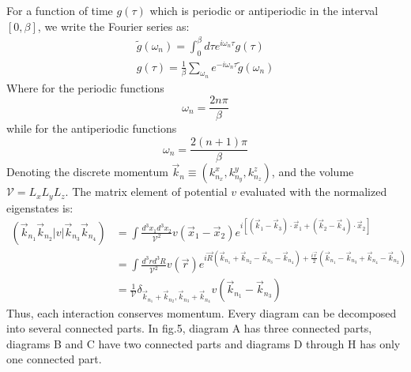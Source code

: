 \documentclass[12pt]{article}
\begin{document}
For a function of time $g(\tau)$ which is periodic or antiperiodic in the interval 
$[0,\beta]$, we write the Fourier series as:
\begin{equation*}
    \begin{split}
        \tilde{g}(\omega_n)=\int_0^\beta d\tau e^{i\omega_n\tau}g(\tau)\\
        g(\tau)=\frac{1}{\beta}\sum_{\omega_n}e^{-i\omega_n\tau}\tilde{g}(\omega_n)
    \end{split}
\end{equation*}
Where for the periodic functions
\begin{equation*}
    \omega_n=\frac{2n\pi}{\beta}
\end{equation*}
while for the antiperiodic functions
\begin{equation*}
    \omega_n=\frac{2(n+1)\pi}{\beta}
\end{equation*}
Denoting the discrete momentum $\vec{k}_n\equiv(k^x_{n_x},k^y_{n_y},k^z_{n_z})$, and 
the volume $\mathcal{V}=L_xL_yL_z$. The matrix element of potential $v$ evaluated 
with the normalized eigenstates is:
\begin{equation*}
    \begin{split}
        (\vec{k}_{n_1}\vec{k}_{n_2}|v|\vec{k}_{n_3}\vec{k}_{n_4})&=\int
        \frac{d^3x_1d^3x_2}{\mathcal{V}^2}v(\vec{x}_1-\vec{x}_2)e^{i
        [(\vec{k}_1-\vec{k}_3)\cdot\vec{x}_1+(\vec{k}_2-\vec{k}_4)\cdot\vec{x}_2]}\\
        &=\int\frac{d^3rd^3R}{\mathcal{V}^2}v(\vec{r})e^{i\vec{R}(\vec{k}_{n_1}
        +\vec{k}_{n_2}-\vec{k}_{n_3}-\vec{k}_{n_4})+\frac{i\vec{r}}{2}(\vec{k}_{n_1}
        -\vec{k}_{n_3}+\vec{k}_{n_4}-\vec{k}_{n_2})}\\
        &=\frac{1}{\mathcal{V}}\delta_{\vec{k}_{n_1}+\vec{k}_{n_2},\vec{k}_{n_3}+
        \vec{k}_{n_4}}v(\vec{k}_{n_1}-\vec{k}_{n_3})
    \end{split}
\end{equation*} 
Thus, each interaction conserves momentum. Every diagram can be decomposed into 
several connected parts. In fig.5, diagram A has three connected parts, diagrams B 
and C have two connected parts and diagrams D through H has only one connected part.
\end{document}
